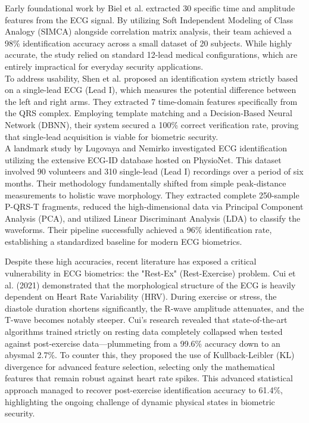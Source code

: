 \documentclass[12pt,a4paper]{report}
\begin{document}
Early foundational work by Biel et al. extracted 30 specific time and amplitude features from the ECG signal. By utilizing Soft Independent Modeling of Class Analogy (SIMCA) alongside correlation matrix analysis, their team achieved a 98\% identification accuracy across a small dataset of 20 subjects. While highly accurate, the study relied on standard 12-lead medical configurations, which are entirely impractical for everyday security applications. \\

To address usability, Shen et al. proposed an identification system strictly based on a single-lead ECG (Lead I), which measures the potential difference between the left and right arms. They extracted 7 time-domain features specifically from the QRS complex. Employing template matching and a Decision-Based Neural Network (DBNN), their system secured a 100\% correct verification rate, proving that single-lead acquisition is viable for biometric security. \\

A landmark study by Lugovaya and Nemirko investigated ECG identification utilizing the extensive ECG-ID database hosted on PhysioNet. This dataset involved 90 volunteers and 310 single-lead (Lead I) recordings over a period of six months. Their methodology fundamentally shifted from simple peak-distance measurements to holistic wave morphology. They extracted complete 250-sample P-QRS-T fragments, reduced the high-dimensional data via Principal Component Analysis (PCA), and utilized Linear Discriminant Analysis (LDA) to classify the waveforms. Their pipeline successfully achieved a 96\% identification rate, establishing a standardized baseline for modern ECG biometrics. \\

\newpage

Despite these high accuracies, recent literature has exposed a critical vulnerability in ECG biometrics: the "Rest-Ex" (Rest-Exercise) problem. Cui et al. (2021) demonstrated that the morphological structure of the ECG is heavily dependent on Heart Rate Variability (HRV). During exercise or stress, the diastole duration shortens significantly, the R-wave amplitude attenuates, and the T-wave becomes notably steeper. Cui's research revealed that state-of-the-art algorithms trained strictly on resting data completely collapsed when tested against post-exercise data—plummeting from a 99.6\% accuracy down to an abysmal 2.7\%. To counter this, they proposed the use of Kullback-Leibler (KL) divergence for advanced feature selection, selecting only the mathematical features that remain robust against heart rate spikes. This advanced statistical approach managed to recover post-exercise identification accuracy to 61.4\%, highlighting the ongoing challenge of dynamic physical states in biometric security.
\end{document}
